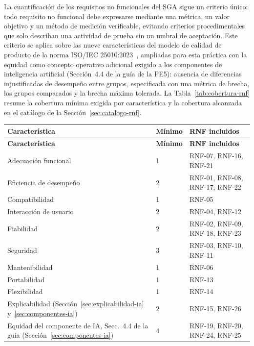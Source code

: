 \documentclass[12pt,a4paper]{article}
\begin{document}
La cuantificación de los requisitos no funcionales del SGA sigue un criterio único: todo requisito no funcional debe expresarse mediante una métrica, un valor objetivo y un método de medición verificable, evitando criterios procedimentales que solo describan una actividad de prueba sin un umbral de aceptación. Este criterio se aplica sobre las nueve características del modelo de calidad de producto de la norma ISO/IEC 25010:2023~\cite{iso25010-2023}, ampliadas para esta práctica con la equidad como concepto operativo adicional exigido a los componentes de inteligencia artificial (Sección~4.4 de la guía de la PE5): ausencia de diferencias injustificadas de desempeño entre grupos, especificada con una métrica de brecha, los grupos comparados y la brecha máxima tolerada. La Tabla~\ref{tab:cobertura-rnf} resume la cobertura mínima exigida por característica y la cobertura alcanzada en el catálogo de la Sección~\ref{sec:catalogo-rnf}.

\begin{center}
\begin{longtable}{|p{5cm}|p{2.2cm}|p{6cm}|}
\hline
\textbf{Característica} & \textbf{Mínimo} & \textbf{RNF incluidos} \\
\hline
\endfirsthead
\hline
\textbf{Característica} & \textbf{Mínimo} & \textbf{RNF incluidos} \\
\hline
\endhead
\hline
\endfoot
\hline
\endlastfoot
Adecuación funcional & 1 & RNF-07, RNF-16, RNF-21 \\
\hline
Eficiencia de desempeño & 2 & RNF-01, RNF-08, RNF-17, RNF-22 \\
\hline
Compatibilidad & 1 & RNF-05 \\
\hline
Interacción de usuario & 2 & RNF-04, RNF-12 \\
\hline
Fiabilidad & 2 & RNF-02, RNF-09, RNF-18, RNF-23 \\
\hline
Seguridad & 3 & RNF-03, RNF-10, RNF-11 \\
\hline
Mantenibilidad & 1 & RNF-06 \\
\hline
Portabilidad & 1 & RNF-13 \\
\hline
Flexibilidad & 1 & RNF-14 \\
\hline
Explicabilidad (Sección~\ref{sec:explicabilidad-ia} y~\ref{sec:componentes-ia}) & 2 & RNF-15, RNF-26 \\
\hline
Equidad del componente de IA, Secc.~4.4 de la guía (Sección~\ref{sec:componentes-ia}) & 4 & RNF-19, RNF-20, RNF-24, RNF-25 \\
\hline
\end{longtable}
\label{tab:cobertura-rnf}
\end{center}
\end{document}
